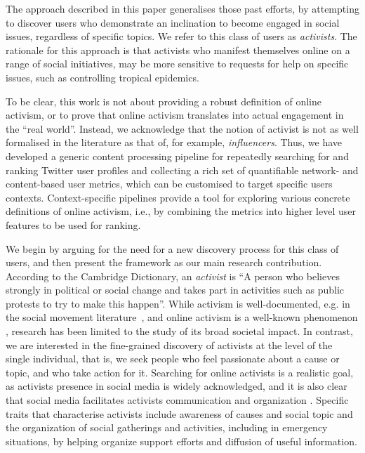 \documentclass[runningheads]{llncs}
\begin{document}
The approach described in this paper generalises those past efforts, by attempting to discover users who demonstrate an inclination to become engaged in social issues, regardless of specific topics. 
We refer to this class of users as \textit{activists}.
The rationale for this approach is that activists who manifest themselves online on a range of social initiatives, may be more sensitive to requests for help on specific issues,  such as controlling tropical epidemics.

To be clear, this work is not about providing a robust definition of online activism, or to prove that online activism translates into actual engagement in the ``real world''.
%
Instead, we acknowledge that the notion of activist is not as well formalised in the literature as that of, for example, \textit{influencers}. 
Thus, we have developed a generic content processing pipeline for repeatedly searching for and ranking Twitter user profiles and collecting a rich set of quantifiable network- and content-based user metrics, which can be customised to target specific users contexts. Context-specific pipelines provide a tool for exploring various concrete definitions of online activism, i.e., by combining the metrics into higher level user features to be used for ranking.

We begin by arguing for the need for a new discovery process for this class of users, and then present the framework as our main research contribution.
%
According to the Cambridge Dictionary, an \textit{activist} is  ``A person who believes strongly in political or social change and takes part in activities such as public protests to try to make this happen''.
%
While activism is well-documented, e.g. in the social movement literature~\cite{doi:10.1080/14742830701497277}, and online activism is a well-known phenomenon \cite{IJoC1246}, research has been limited to the study of its broad societal impact. 
In contrast, we are interested in the fine-grained discovery of activists at the level of the single individual, that is, we seek people who feel passionate about a cause or topic, and who take action for it. 
Searching for online activists is a realistic goal, as activists presence in social media is widely acknowledged, and it is also clear that social media facilitates activists communication and organization \cite{Poell2014,Youmans2012}.  
Specific traits that characterise activists include awareness of causes and social topic and the organization of social gatherings and activities, including in emergency situations, by helping organize support efforts and diffusion of useful information.
 
\end{document}
